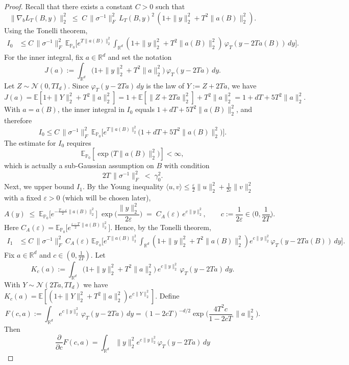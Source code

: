 \documentclass[11pt]{article}
\theoremstyle{definition}
\newcommand{\R}{\mathbb{R}}
\newcommand{\E}{\mathbb{E}}
\begin{document}
\begin{proof}
Recall that there exists a constant $C > 0$ such that
\[
\|\nabla_b L_T(B,y)\|_2^2
\;\le\;C\,\|\sigma^{-1}\|_F^2\,L_T(B,y)^2\,(1+\|y\|_2^2+T^2\|a(B)\|_2^2).
\]
Using the Tonelli theorem,
\[
\begin{aligned}
I_0
&\le C\,\|\sigma^{-1}\|_F^2\,\E_{\mathbb{P}_0}\!\Big[e^{T\|a(B)\|_2^2}
\!\!\int_{\R^d}\!(1+\|y\|_2^2+T^2\|a(B)\|_2^2)\,\varphi_T(y-2Ta(B))\,dy\Big].
\end{aligned}
\]For the inner integral, 
fix \(a\in\R^d\) and set the notation
\[
J(a):=\int_{\R^d}\bigl(1+\|y\|_2^2+T^2\|a\|_2^2\bigr)\,\varphi_T(y-2Ta)\,dy.
\]
Let \(Z\sim\mathcal N(0,T I_d)\). Since \(\varphi_T(y-2Ta)\,dy\) is the law of \(Y:=Z+2Ta\), we have 
\[
J(a)=\E\!\left[1+\|Y\|_2^2+T^2\|a\|_2^2\right]
=1+\E\left[\|Z+2Ta\|_2^2\right]+T^2\|a\|_2^2 = 1+dT+5T^2\|a\|_2^2.
\]
With \(a=a(B)\), the inner integral in \(I_0\) equals \(1+dT+5T^2\|a(B)\|_2^2\), and therefore
\[
I_0 \le C\,\|\sigma^{-1}\|_F^2\,
\E_{\mathbb{P}_0}\!\Big[e^{T\|a(B)\|_2^2}\big(1+dT+5T^2\|a(B)\|_2^2\big)\Big].
\]
The estimate for \(I_0\) requires
\[
\mathbb{E}_{\mathbb{P}_0}\!\left[\exp\!\big(T\|a(B)\|_2^{2}\big)\right] < \infty,
\]
which is actually a sub-Gaussian assumption on \(B\) with condition
\[
2T\,\|\sigma^{-1}\|_F^{2} \;<\; \gamma_0^{2}.
\]
Next, we upper bound $I_1$. By the Young inequality \(\langle u,v\rangle\le \tfrac{\varepsilon}{2}\|u\|_2^2+\tfrac{1}{2\varepsilon}\|v\|_2^2\) with a fixed $\varepsilon > 0$ (which will be chosen later),
\[
A(y)\;\le\;\E_{\mathbb{P}_0}\!\Big[e^{-\frac{T-\varepsilon}{2}\|a(B)\|_2^2}\Big]\;
\exp\!\Big(\frac{\|y\|_2^2}{2\varepsilon}\Big)
\;=\;C_A(\varepsilon)\,e^{c\|y\|_2^2},
\qquad c:=\frac{1}{2\varepsilon}\in\Big(0,\frac{1}{2T}\Big).
\]
Here \(C_A(\varepsilon)=\E_{\mathbb{P}_0}\!\big[e^{\frac{\varepsilon-T}{2}\|a(B)\|_2^2}\big]\).
Hence, by the Tonelli theorem,
\[
\begin{aligned}
I_1
&\le C\,\|\sigma^{-1}\|_F^2\,C_A(\varepsilon)\,
\E_{\mathbb{P}_0}\!\Big[e^{T\|a(B)\|_2^2}\!\int_{\R^d}(1+\|y\|_2^2+T^2\|a(B)\|_2^2)e^{c\|y\|_2^2}\varphi_T(y-2Ta(B))\,dy\Big].
\end{aligned}
\]
Fix \(a\in\R^d\) and \(c\in(0,\frac{1}{2T})\). Let
\[
K_c(a):=\int_{\R^d}\bigl(1+\|y\|_2^2+T^2\|a\|_2^2\bigr)\,e^{c\|y\|_2^2}\,\varphi_T(y-2Ta)\,dy.
\]
With \(Y\sim\mathcal N(2Ta,TI_d)\) we have \(K_c(a)=\E[(1+\|Y\|_2^2+T^2\|a\|_2^2)e^{c\|Y\|_2^2}]\).
Define
\[
F(c,a):=\int_{\R^d} e^{c\|y\|_2^2}\,\varphi_T(y-2Ta)\,dy
=(1-2cT)^{-d/2}\exp\!\Big(\frac{4T^2 c}{1-2cT}\,\|a\|_2^2\Big).
\]
Then
\[
\frac{\partial}{\partial c}F(c,a)
=\int_{\R^d}\|y\|_2^2 e^{c\|y\|_2^2}\varphi_T(y-2Ta)\,dy
\]
\end{proof}
\end{document}
